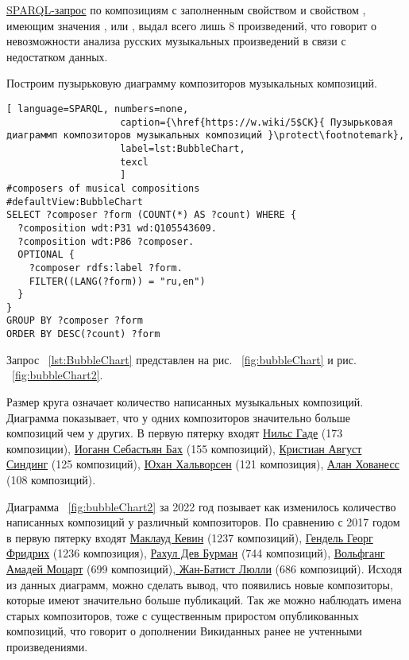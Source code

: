 \href{https://w.wiki/56Rj}{SPARQL-запрос} по композициям с заполненным свойством  и свойством , имеющим значения ,  или , выдал всего лишь \num{8} произведений, что говорит о невозможности анализа русских музыкальных произведений в связи с недостатком данных.

Построим пузырьковую диаграмму композиторов музыкальных композиций.

\begin{lstlisting}[ language=SPARQL, numbers=none,
                    caption={\href{https://w.wiki/5$CK}{ Пузырьковая диаграммп композиторов музыкальных композиций }\protect\footnotemark},
                    label=lst:BubbleChart,
                    texcl 
                    ]
#composers of musical compositions
#defaultView:BubbleChart
SELECT ?composer ?form (COUNT(*) AS ?count) WHERE {
  ?composition wdt:P31 wd:Q105543609.
  ?composition wdt:P86 ?composer.
  OPTIONAL {
    ?composer rdfs:label ?form.
    FILTER((LANG(?form)) = "ru,en")
  }
}
GROUP BY ?composer ?form
ORDER BY DESC(?count) ?form
\end{lstlisting}%

Запрос ~\ref{lst:BubbleChart} представлен на рис. ~\ref{fig:bubbleChart} и рис. ~\ref{fig:bubbleChart2}.

Размер круга означает количество написанных музыкальных композиций. Диаграмма показывает, что у одних композиторов значительно больше композиций чем у других. В первую пятерку входят \href{https://ru.wikipedia.org/wiki/Гаде,_Нильс}{Нильс Гаде} (\num{173} композиции), \href{https://ru.wikipedia.org/wiki/Бах,_Иоганн_Себастьян}{Иоганн Себастьян Бах} (\num{155} композиций), \href{https://ru.wikipedia.org/wiki/Синдинг,_Кристиан_Август}{Кристиан Август Синдинг} (\num{125} композиций), \href{https://ru.wikipedia.org/wiki/Хальворсен,_Юхан}{Юхан Хальворсен} (\num{121} композиция), \href{https://ru.wikipedia.org/wiki/Хованесс,_Алан}{Алан Хованесс} (\num{108} композиций).

Диаграмма ~\ref{fig:bubbleChart2} за 2022 год позывает как изменилось количество написанных композиций у различный композиторов. По сравнению с 2017 годом в первую пятерку входят \href{https://ru.wikipedia.org/wiki/Маклауд,_Кевин}{Маклауд Кевин} (\num{1237} композиций), \href{https://ru.wikipedia.org/wiki/Гендель,_Георг_Фридрих}{Гендель Георг Фридрих} (\num{1236} композиция), \href{https://en.wikipedia.org/wiki/R._D._Burman}{Рахул Дев Бурман} (\num{744} композиций), \href{https://ru.wikipedia.org/wiki/Моцарт,_Вольфганг_Амадей}{Вольфганг Амадей Моцарт} (\num{699} композиций),\href{https://ru.wikipedia.org/wiki/Люлли,_Жан-Батист}{ Жан-Батист Люлли} (\num{686} композиций). Исходя из данных диаграмм, можно сделать вывод, что появились новые композиторы, которые имеют значительно больше публикаций. Так же можно наблюдать имена старых композиторов, тоже с существенным приростом опубликованных композиций, что говорит о дополнении Викиданных ранее не учтенными произведениями.


